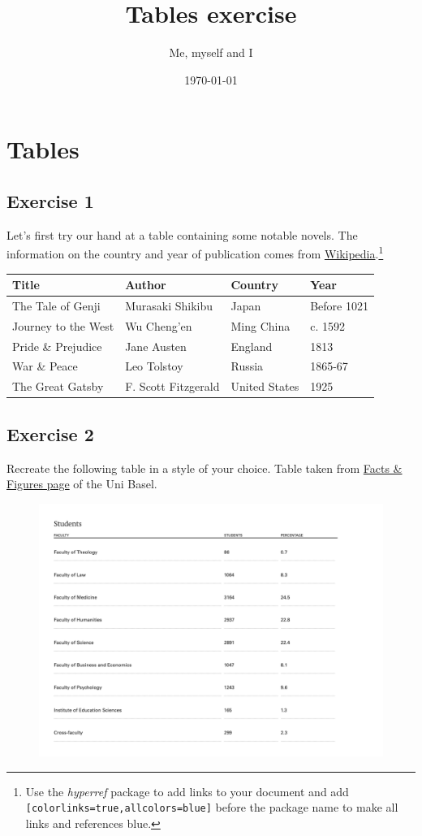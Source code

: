 \documentclass[a4paper]{article}
\title{Tables exercise}
\author{Me, myself and I}
\date{\today}
\begin{document}
\maketitle
	
\section*{Tables}
\subsection*{Exercise 1}

\noindent Let's first try our hand at a table containing some notable novels. The information on the country and year of publication comes from \href{https://en.wikipedia.org/wiki/Main_Page}{Wikipedia}.\footnote{Use the \textit{hyperref} package to add links to your document and add \texttt{[colorlinks=true,allcolors=blue]} before the package name to make all links and references blue.}

\begin{center}
\begin{tabular}{||l | l | l | l ||} 
 \hline
 \textbf{Title} & \textbf{Author} & \textbf{Country} & \textbf{Year}\\ [1mm] 
 \hline
 \hline 
 The Tale of Genji & Murasaki Shikibu & Japan & Before 1021 \\  
 \hline
 Journey to the West & Wu Cheng'en & Ming China & c. 1592 \\
 \hline
 Pride \& Prejudice & Jane Austen & England & 1813 \\ 
 \hline
 War \& Peace & Leo Tolstoy & Russia & 1865-67 \\
 \hline
  The Great Gatsby & F. Scott Fitzgerald & United States & 1925 \\
 \hline
\end{tabular}
\end{center}

\newpage

\subsection*{Exercise 2}
Recreate the following table in a style of your choice. Table taken from \href{https://www.unibas.ch/en/University/About-University/Facts-Figures.html}{Facts \& Figures page} of the Uni Basel.\\

\begin{figure}[h!]
    \centering
    \includegraphics[width=\textwidth]{number_of_students.png}
\end{figure}
		
\end{document}
